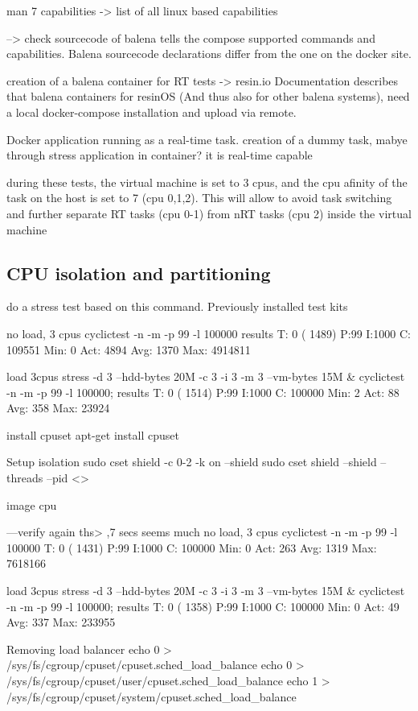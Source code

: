 \documentclass[]{scrartcl}
\begin{document}
man 7 capabilities  -> list of all linux based capabilities

--> check sourcecode of balena tells the compose supported commands and capabilities. Balena sourcecode declarations differ from the one on the docker site.

creation of a balena container for RT tests
-> resin.io
Documentation describes that balena containers for resinOS (And thus also for other balena systems), need a local docker-compose installation and upload via remote.

Docker application running as a real-time task. creation of a dummy task, mabye through stress application in container? it is real-time capable

during these tests, the virtual machine is set to 3 cpus, and the cpu afinity of the task on the host is set to 7 (cpu 0,1,2). This will allow to avoid task switching and further separate RT tasks (cpu 0-1) from nRT tasks (cpu 2) inside the virtual machine

\subsection{CPU isolation and partitioning}

do a stress test based on this command. Previously installed test kits

no load, 3 cpus
cyclictest -n -m -p 99 -l 100000
results
T: 0 ( 1489) P:99 I:1000 C: 109551 Min:      0 Act: 4894 Avg: 1370 Max:  4914811

load 3cpus
stress -d 3 --hdd-bytes 20M -c 3 -i 3 -m 3 --vm-bytes 15M & cyclictest -n -m -p 99 -l 100000;
results
T: 0 ( 1514) P:99 I:1000 C: 100000 Min:      2 Act:   88 Avg:  358 Max:   23924


install cpuset
apt-get install cpuset


Setup isolation
sudo cset shield -c 0-2 -k on --shield
sudo cset shield --shield --threads --pid <>

image cpu


---verify again ths> ,7 secs seems much
no load, 3 cpus
cyclictest -n -m -p 99 -l 100000
T: 0 ( 1431) P:99 I:1000 C: 100000 Min:      0 Act:  263 Avg: 1319 Max:  7618166

load 3cpus
stress -d 3 --hdd-bytes 20M -c 3 -i 3 -m 3 --vm-bytes 15M & cyclictest -n -m -p 99 -l 100000;
results
T: 0 ( 1358) P:99 I:1000 C: 100000 Min:      0 Act:   49 Avg:  337 Max:   233955

Removing load balancer
echo 0 > /sys/fs/cgroup/cpuset/cpuset.sched_load_balance
echo 0 > /sys/fs/cgroup/cpuset/user/cpuset.sched_load_balance
echo 1 > /sys/fs/cgroup/cpuset/system/cpuset.sched_load_balance
\end{document}
